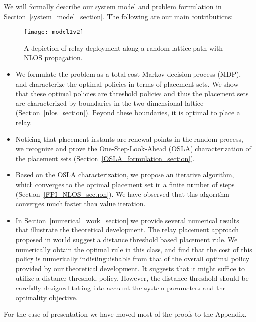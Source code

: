 \documentclass[conference]{IEEEtran}
\begin{document}
We will formally describe our system model and problem formulation in
Section~\ref{system_model_section}.  The following are our main
contributions:

\begin{figure}[t]
\centering
\texttt{[image: model1v2]}
\caption{\label{lattice-path-figure} A depiction of relay deployment 
along a random lattice path with NLOS propagation.}
\vspace{-6mm}
\end{figure}

\begin{itemize}
\item We formulate the problem as a total cost Markov decision process
  (MDP), and characterize the optimal policies in terms of placement
  sets. We show that these optimal policies are threshold policies and
  thus the placement sets are characterized by boundaries in the
  two-dimensional lattice (Section~\ref{nlos_section}). Beyond these
  boundaries, it is optimal to place a relay.
\item Noticing that placement instants are renewal points in the
  random process, we recognize and prove the One-Step-Look-Ahead
  (OSLA) characterization of the placement sets
  (Section~\ref{OSLA_formulation_section}).
\item Based on the OSLA characterization, we propose an iterative
  algorithm, which converges to the optimal placement set in a finite
  number of steps (Section~\ref{FPI_NLOS_section}). We have observed
  that this algorithm converges much faster than value iteration.
\item In Section~\ref{numerical_work_section} we provide several
  numerical results that illustrate the theoretical development. The
  relay placement approach proposed in
  \cite{mobihoc.naudts-etal07monitoring-planning-tool,
    mobihoc.souryal-etal07real-time-deployment-range-extension,
    mobihoc.souryal-etal09rapidly-deployable-mesh-network-testbed,
    mobihoc.aurisch-tlle09relay-placement-emergency-response} would
  suggest a distance threshold based placement rule. We numerically
  obtain the optimal rule in this class, and find that the cost of
  this policy is numerically indistinguishable from that of the
  overall optimal policy provided by our theoretical development. It
  suggests that it might suffice to utilize a distance threshold
  policy. However, the distance threshold should be carefully designed
  taking into account the system parameters and the optimality
  objective.
\end{itemize}
For the ease of presentation we have moved most of the proofs
to the Appendix. 
\end{document}
